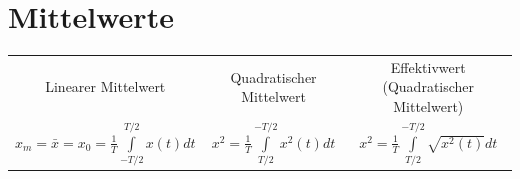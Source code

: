\documentclass[margin=normal]{tex/hsrzf}
\begin{document}
\section{Mittelwerte}
\begin{tabular}{ccc}
  Linearer Mittelwert & Quadratischer Mittelwert & Effektivwert \tiny{(Quadratischer Mittelwert)}\\
  $ x_m = \bar{x} = x_0 = \frac{1}{T} 
  \int \limits _{-T/2}^{T/2} x(t) dt $ &
  $ x^2 = \frac{1}{T} \int \limits _{T/2}^{-T/2} x^2(t) dt $ &
  $ x^2 = \frac{1}{T} \int \limits _{T/2}^{-T/2} \sqrt{x^2(t)} dt $

\end{tabular} 
\end{document}
